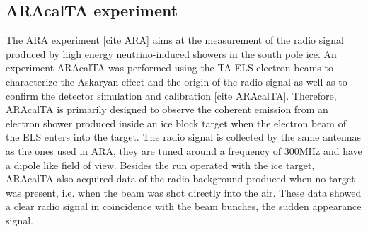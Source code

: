 \documentclass[12pt]{article}
\begin{document}
\subsection{ARAcalTA experiment}
The ARA experiment \color{red} [cite ARA] \color{black} aims at the measurement of the radio signal produced by high energy neutrino-induced showers in the south pole ice.   
An experiment ARAcalTA was performed using the TA ELS electron beams
to characterize the Askaryan effect and the origin of the radio signal as well as to confirm the detector simulation and calibration \color{red} [cite ARAcalTA].
\color{black}
Therefore, ARAcalTA is primarily designed to observe the coherent emission from an electron shower produced inside an ice block target when the electron beam of the ELS enters into the target. 
The radio signal is collected by the same antennas as the ones used in ARA, they are tuned around a frequency of 300MHz and have a dipole like field of view.
Besides the run operated with the ice target, ARAcalTA  also acquired data of the radio background produced when no target was present, i.e. when the beam was shot directly into the air. 
These data showed a clear radio signal in coincidence with the beam bunches, the sudden appearance signal. 

\end{document}
